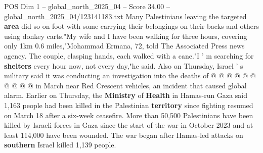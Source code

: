 \begin{textsample}{POS Dim 1 – global\_north\_2025\_04 – Score 34.00 – global\_north\_2025\_04/123141183.txt}
Many Palestinians leaving the targeted \textbf{area} did so on foot with some carrying their belongings on their backs and others using donkey carts."My wife and I have been walking for three hours, covering only 1km 0.6 miles,"Mohammad Ermana, 72, told The Associated Press news agency.
The couple, clasping hands, each walked with a cane."I ' m searching for \textbf{shelters} every hour now, not every day,"he said.
Also on Thursday, Israel ' s military said it was conducting an investigation into the deaths of @ @ @ @ @ @ @ @ @ @ in March near Red Crescent vehicles, an incident that caused global alarm.
Earlier on Thursday, the \textbf{Ministry} of \textbf{Health} in Hamas-run Gaza said 1,163 people had been killed in the Palestinian \textbf{territory} since fighting resumed on March 18 after a six-week ceasefire.
More than 50,500 Palestinians have been killed by Israeli forces in Gaza since the start of the war in October 2023 and at least 114,000 have been wounded.
The war began after Hamas-led attacks on \textbf{southern} Israel killed 1,139 people.

\end{textsample}
